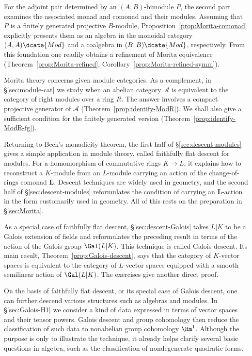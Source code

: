 For the adjoint pair determined by an $(A,B)$-bimodule $P$, the second part
examines the associated monad and comonad and their modules. Assuming that
$P$ is a finitely generated projective $B$-module,
Proposition~\ref{prop:Morita-comonad} explicitly presents them as an algebra
in the monoidal category $(A,A)\dcate{Mod}$ and a coalgebra in
$(B,B)\dcate{Mod}$, respectively. From this foundation one readily obtains a
refinement of Morita equivalence (Theorem~\ref{prop:Morita-refined},
Corollary~\ref{prop:Morita-refined-symm}).

Morita theory concerns given module categories. As a complement, in
\S\ref{sec:module-cat} we study when an abelian category $\mathcal{A}$ is
equivalent to the category of right modules over a ring $R$. The answer
involves a compact projective generator of $\mathcal{A}$
(Theorem~\ref{prop:identify-ModR}). We shall also give a sufficient condition
for the finitely generated version
(Theorem~\ref{prop:identify-ModR-fg}).

Returning to Beck's monadicity theorem, the first half of
\S\ref{sec:descent-modules} gives a simple application in module theory,
called faithfully flat descent for modules. For a homomorphism of commutative
rings $K\to L$, it explains how to reconstruct a $K$-module from an
$L$-module carrying an action of the change-of-rings comonad $\mathbf{L}$.
Descent techniques are widely used in geometry, and the second half of
\S\ref{sec:descent-modules} reformulates the condition of carrying an
$\mathbf{L}$-action in the form customarily used in geometry. All of this
rests on the preparation in \S\ref{sec:Morita}.

As a special case of faithfully flat descent, \S\ref{sec:descent-Galois}
takes $L|K$ to be a Galois extension of fields and reformulates the preceding
result in terms of the action of the Galois group $\Gal(L|K)$. This technique
is called Galois descent. Its main result,
Theorem~\ref{prop:Galois-descent}, says that the category of $K$-vector
spaces is equivalent to the category of $L$-vector spaces equipped with a
smooth semilinear action of $\Gal(L|K)$. The exercises give another direct
proof.

On the basis of faithfully flat descent, or its special case of Galois
descent, one can further descend various structures such as algebras and
modules. In \S\ref{sec:Galois-H1} we consider a kind of data expressed in
terms of vector spaces and their tensor powers. Galois descent and group
cohomology then reduce the classification of such data to nonabelian group
cohomology $\Hm^1$. Although the purpose is only to illustrate the technique,
it already helps clarify several basic questions in algebra, such as the
classification of nondegenerate quadratic forms.

